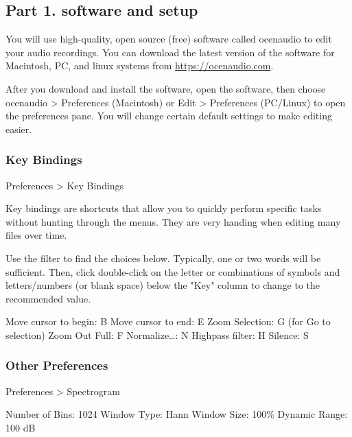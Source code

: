 \documentclass[12pt]{article}
\begin{document}
\thispagestyle{plain}

\subsection*{Part 1. software and setup}

You will use high-quality, open source (free) software called ocenaudio to edit your audio recordings. You can download the latest version of the software for Macintosh, PC, and linux systems from \url{https://ocenaudio.com}.

After you download and install the software, open the software, then choose ocenaudio > Preferences (Macintosh) or Edit > Preferences (PC/Linux) to open the preferences pane. You will change certain default settings to make editing easier.

\subsubsection*{Key Bindings}

Preferences > Key Bindings


Key bindings are shortcuts that allow you to quickly perform specific tasks without hunting through the menus. They are very handing when editing many files over time.


Use the filter to find the choices below. Typically, one or two words will be sufficient. Then, click double-click on the letter or combinations of symbols and letters/numbers (or blank space) below the "Key" column to change to the recommended value.

Move cursor to begin: B\newline
Move cursor to end: E\newline
Zoom Selection: G (for Go to selection)\newline
Zoom Out Full: F\newline
Normalize\ldots: N\newline
Highpass filter: H\newline
Silence: S


\subsubsection*{Other Preferences}

Preferences > Spectrogram

Number of Bins: 1024\newline
Window Type: Hann\newline
Window Size: 100\%\newline
Dynamic Range: 100 dB
\end{document}

